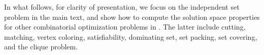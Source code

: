 \documentclass[review, onefignum, onetabnum]{siamart190516}
\begin{document}
In what follows, for clarity of presentation, we focus on the independent set problem in the main text, and show how to compute the solution space properties for other combinatorial optimization problems in . The latter include cutting, matching, vertex coloring, satisfiability,  dominating set,  set packing,  set covering, and the clique problem.
\end{document}
